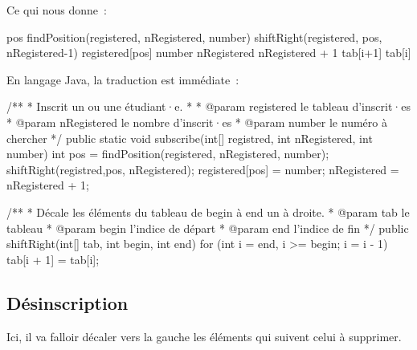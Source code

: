 			Ce qui nous donne~:
			
			\begin{pseudocode}
					\Stmt pos \Gets findPosition(registered, nRegistered, number)
					\Stmt shiftRight(registered, pos, nRegistered-1)
					\Let registered[pos] \Gets number
					\Let nRegistered \Gets nRegistered + 1
				\EndAlgo
				\Empty
						\Let tab[i+1] \Gets tab[i]
					\EndFor
				\EndAlgo
			\end{pseudocode}
	
			En langage Java, la traduction est immédiate~:

			\begin{java}
/**
 * Inscrit un ou une étudiant·e.
 * 
 * @param registered le tableau d'inscrit·es
 * @param nRegistered le nombre d'inscrit·es
 * @param number le numéro à chercher
 */
public static void subscribe(int[] registred, int nRegistered,
				int number){
	int pos = findPosition(registered, nRegistered, number);
	shiftRight(registred,pos, nRegistered);
	registered[pos] = number;
	nRegistered = nRegistered + 1;
}

/**
 * Décale les éléments du tableau de begin à end un à droite.
 * @param tab le tableau
 * @param begin l'indice de départ
 * @param end l'indice de fin
 */
public shiftRight(int[] tab, int begin, int end){
	for (int i = end, i >= begin; i = i - 1){
		tab[i + 1] = tab[i];
	}
}
			\end{java}

			
		\subsection{Désinscription}
		
			Ici, il va falloir décaler vers la gauche
			les éléments qui suivent celui à supprimer.


